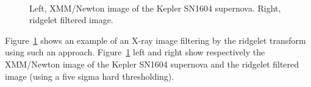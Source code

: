 \begin{figure}[htb]
\centerline{  
\hbox{
}}
\caption{Left, XMM/Newton image of the Kepler SN1604 supernova.
Right, ridgelet filtered image.}
\label{fig_sn1604}
\end{figure}
Figure~\ref{fig_sn1604} shows an example of an X-ray image filtering by the
ridgelet transform using such an approach. Figure~\ref{fig_sn1604} left
and right 
show respectively the  XMM/Newton image of the Kepler SN1604 supernova and
the ridgelet filtered image (using a five sigma hard thresholding). 


